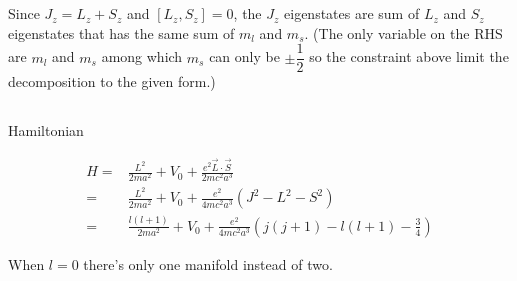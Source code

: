 \documentclass[10pt,fleqn]{article}
\newcommand{\eqar}[1]
{
  \begin{align*}
    #1
  \end{align*}
}
\newcommand{\paren}[1]{{\left({#1}\right)}}
\newcommand{\sqr}[1]{{\left[{#1}\right]}}
\begin{document}
\section{}
\section{}
\subsection{}
Since $J_z=L_z+S_z$ and $\sqr{L_z, S_z}=0$, the $J_z$ eigenstates are sum of
$L_z$ and $S_z$ eigenstates that has the same sum of $m_l$ and $m_s$.
(The only variable on the RHS are $m_l$ and $m_s$ among which $m_s$ can only be
$\pm\dfrac12$ so the constraint above limit the decomposition to the given form.)
\subsection{}
Hamiltonian
\eqar{
  H=&\frac{L^2}{2ma^2}+V_0+\frac{e^2\vec L\cdot\vec S}{2mc^2a^3}\\
  =&\frac{L^2}{2ma^2}+V_0+\frac{e^2}{4mc^2a^3}\paren{J^2-L^2-S^2}\\
  =&\frac{l\paren{l+1}}{2ma^2}+V_0+\frac{e^2}{4mc^2a^3}\paren{j\paren{j+1}-l\paren{l+1}-\frac34}
}
When $l=0$ there's only one manifold instead of two.
\end{document}
